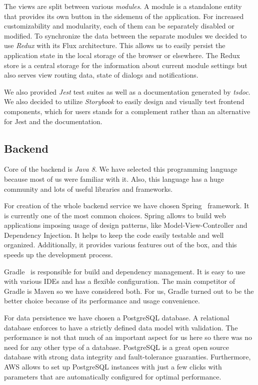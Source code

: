 \documentclass[licencjacka,en]{thesisclass}
\begin{document}
    The views are split between various \textit{modules}.
    A module is a standalone entity that provides its
    own button in the sidemenu of the application.
    For increased customizability and modularity, each of them
    can be separately disabled or modified.
    To synchronize the data between the separate modules we decided
    to use \textit{Redux} with its Flux architecture.
    This allows us to easily persist the application state
    in the local storage of the browser or elsewhere.
    The Redux store is a central storage for the information
    about current module settings but also serves view routing data,
    state of dialogs and notifications.

    We also provided \textit{Jest} test suites
    as well as a documentation generated by \textit{tsdoc}.
    We also decided to utilize \textit{Storybook}
    to easily design and visually test frontend components,
    which for users stands for a complement
    rather than an alternative for Jest and the documentation.

    \subsection{Backend}

    Core of the backend is \textit{Java 8}.
    We have selected this programming language because most of us were familiar with it.
    Also, this language has a huge community and lots of useful libraries and frameworks.

    For creation of the whole backend service we have chosen Spring~\cite{Spring} framework.
    It is currently one of the most common choices.
    Spring allows to build web applications imposing usage
    of design patterns, like Model-View-Controller and Dependency Injection.
    It helps to keep the code easily testable and well organized.
    Additionally, it provides various features out of the box,
    and this speeds up the development process.

    Gradle~\cite{Gradle} is responsible for build and dependency management.
    It is easy to use with various IDEs and has a flexible configuration.
    The main competitor of Gradle is Maven so we have considered both.
    For us, Gradle turned out to be the better choice because
    of its performance and usage convenience.

    For data persistence we have chosen a PostgreSQL database.
    A relational database enforces to have a strictly defined data model with validation.
    The performance is not that much of an important aspect for us here
    so there was no need for any other type of a database.
    PostgreSQL is a great open source database with strong data integrity
    and fault-tolerance guaranties.
    Furthermore, AWS allows to set up PostgreSQL instances with just a few clicks
    with parameters that are automatically configured for optimal performance.
\end{document}
